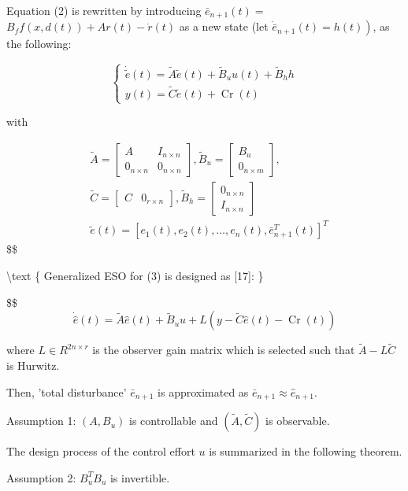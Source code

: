 \documentclass[10pt]{article}
\begin{document}
Equation (2) is rewritten by introducing $\bar{e}_{n+1}(t)=$ $B_{f} f(x, d(t))+A r(t)-\dot{r}(t)$ as a new state (let $\left.\dot{\bar{e}}_{n+1}(t)=h(t)\right)$, as the following:

$$
\left\{\begin{array}{l}
\dot{\tilde{e}}(t)=\tilde{A} \tilde{e}(t)+\tilde{B}_{u} u(t)+\tilde{B}_{h} h \\
y(t)=\tilde{C} \tilde{e}(t)+\operatorname{Cr}(t)
\end{array}\right.
$$

with

$$
\begin{aligned}
& \tilde{A}=\left[\begin{array}{cc}
A & I_{n \times n} \\
0_{n \times n} & 0_{n \times n}
\end{array}\right], \tilde{B}_{u}=\left[\begin{array}{c}
B_{u} \\
0_{n \times m}
\end{array}\right], \\
& \tilde{C}=\left[\begin{array}{ll}
C & 0_{r \times n}
\end{array}\right], \tilde{B}_{h}=\left[\begin{array}{c}
0_{n \times n} \\
I_{n \times n}
\end{array}\right] \\
& \tilde{e}(t)=\left[e_{1}(t), e_{2}(t), \ldots, e_{n}(t), \bar{e}_{n+1}^{T}(t)\right]^{T}
\end{aligned}
$$\$\$

\textbackslash text \{ Generalized ESO for (3) is designed as [17]: \}

\$\$$$
\dot{\hat{e}}(t)=\tilde{A} \hat{e}(t)+\widetilde{B}_{u} u+L(y-\tilde{C} \hat{e}(t)-\operatorname{Cr}(t))
$$

where $L \in R^{2 n \times r}$ is the observer gain matrix which is selected such that $\tilde{A}-L \tilde{C}$ is Hurwitz.

Then, 'total disturbance' $\bar{e}_{n+1}$ is approximated as $\bar{e}_{n+1} \approx \hat{e}_{n+1}$.

Assumption 1: $\left(A, B_{u}\right)$ is controllable and $(\tilde{A}, \tilde{C})$ is observable.

The design process of the control effort $u$ is summarized in the following theorem.

Assumption 2: $B_{u}^{T} B_{u}$ is invertible.
\end{document}

